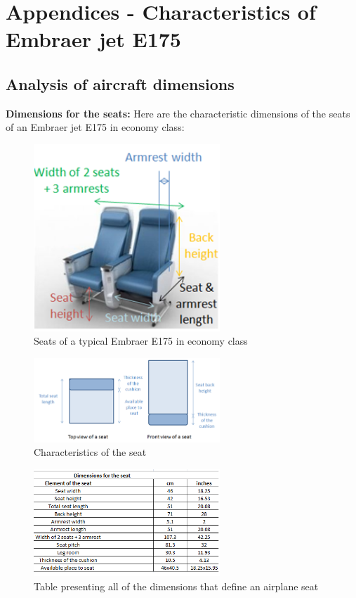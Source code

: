 \chapter{Appendices - Characteristics of Embraer jet E175}

\section{Analysis of aircraft dimensions}
\textbf{Dimensions for the seats:}
Here are the characteristic dimensions of the seats of an Embraer jet E175 in economy class:
\begin{figure}[h]
\centering
\includegraphics[width=7cm]{images/seat_dimensions_image_global.png}
\caption{Seats of a typical Embraer E175 in economy class}
\label{fig:seat_dimensions_1}
\end{figure}

\begin{figure}[h]
\centering
\includegraphics[width=7cm]{images/seat_dimensions_image_topandfront_view.png}
\caption{Characteristics of the seat}
\label{fig: seat_dimensions_2}
\end{figure}

\begin{figure}[h]
\centering
\includegraphics[width=7cm]{images/seat_dimensions_table}
\caption{Table presenting all of the dimensions that define an airplane seat}
\label{fig: seat_dimensions_table}
\end{figure}


